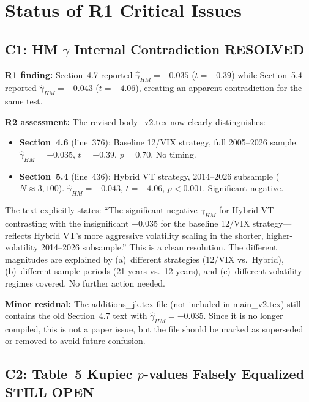 \documentclass[12pt,a4paper]{article}
\begin{document}
\bigskip

\section*{Status of R1 Critical Issues}

\subsection*{C1: HM $\gamma$ Internal Contradiction \hfill \textcolor{okgreen}{RESOLVED}}

\textbf{R1 finding:} Section~4.7 reported $\hat{\gamma}_{HM} = -0.035$ ($t = -0.39$) while Section~5.4 reported $\hat{\gamma}_{HM} = -0.043$ ($t = -4.06$), creating an apparent contradiction for the same test.

\textbf{R2 assessment:} The revised body\_v2.tex now clearly distinguishes:
\begin{itemize}[nosep]
\item \textbf{Section~4.6} (line~376): Baseline 12/VIX strategy, full 2005--2026 sample. $\hat{\gamma}_{HM} = -0.035$, $t = -0.39$, $p = 0.70$. No timing.
\item \textbf{Section~5.4} (line~436): Hybrid VT strategy, 2014--2026 subsample ($N \approx 3{,}100$). $\hat{\gamma}_{HM} = -0.043$, $t = -4.06$, $p < 0.001$. Significant negative.
\end{itemize}
The text explicitly states: ``The significant negative $\gamma_{HM}$ for Hybrid VT---contrasting with the insignificant $-0.035$ for the baseline 12/VIX strategy---reflects Hybrid VT's more aggressive volatility scaling in the shorter, higher-volatility 2014--2026 subsample.'' This is a clean resolution. The different magnitudes are explained by (a)~different strategies (12/VIX vs.\ Hybrid), (b)~different sample periods (21 years vs.\ 12 years), and (c)~different volatility regimes covered. No further action needed.

\textbf{Minor residual:} The additions\_jk.tex file (not included in main\_v2.tex) still contains the old Section~4.7 text with $\hat{\gamma}_{HM} = -0.035$. Since it is no longer compiled, this is not a paper issue, but the file should be marked as superseded or removed to avoid future confusion.


\subsection*{C2: Table~5 Kupiec $p$-values Falsely Equalized \hfill \textcolor{errorred}{STILL OPEN}}
\end{document}
